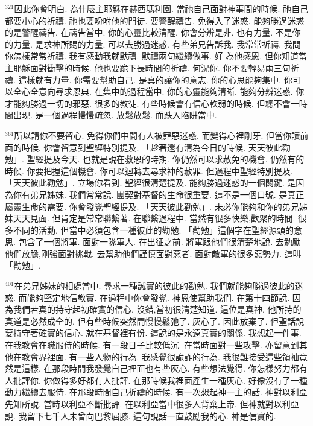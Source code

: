 \documentclass{book}
\begin{document}
$^{321}$因此你會明白.
為什麼主耶穌在赫西瑪利園.
當祂自己面對神事間的時候.
祂自己都要小心的祈禱.
祂也要吩咐他的門徒.
要警醒禱告.
免得入了迷惑.
能夠勝過迷惑的是警醒禱告.
在禱告當中.
你的心靈比較清醒.
你會分辨是非.
也有力量.
不是你的力量.
是求神所賜的力量.
可以去勝過迷惑.
有些弟兄告訴我.
我常常祈禱.
我問你怎樣常常祈禱.
我有感動我就默禱.
默禱兩句繼續做事.
好 為他感恩.
但你知道當主耶穌面對衝擊的時候.
他也要跪下長時間的祈禱.
何況你.
你不要輕易兩三句祈禱.
這樣就有力量.
你需要幫助自己.
是真的讓你的意志.
你的心思能夠集中.
你可以全心全意向尋求恩典.
在集中的過程當中.
你的心靈能夠清晰.
能夠分辨迷惑.
你才能夠勝過一切的邪惡.
很多的教徒.
有些時候會有信心軟弱的時候.
但總不會一時間出現.
是一個過程慢慢疏忽.
放鬆放鬆.
而跌入陷阱當中.

$^{361}$所以請你不要留心.
免得你們中間有人被罪惡迷惑.
而變得心裡剛牙.
但當你讀前面的時候.
你會留意到聖經特別提及.
「趁著還有清為今日的時候.
天天彼此勸勉」.
聖經提及今天.
也就是說在救恩的時期.
你仍然可以求赦免的機會.
仍然有的時候.
你要把握這個機會.
你可以迴轉去尋求神的赦罪.
但過程中聖經特別提及.
「天天彼此勸勉」.
立場你看到.
聖經很清楚提及.
能夠勝過迷惑的一個關鍵.
是因為你有弟兄姊妹.
我們常常說.
團契對基督的生命很重要.
這不是一個口號.
是真正屬靈生命的需要.
你會發覺聖經提及.
「天天彼此勸勉」.
未必你能夠和你的弟兄姊妹天天見面.
但肯定是常常聯繫著.
在聯繫過程中.
當然有很多快樂,歡聚的時間.
很多不同的活動.
但當中必須包含一種彼此的勸勉.
「勸勉」這個字在聖經源頭的意思.
包含了一個將軍.
面對一隊軍人.
在出征之前.
將軍跟他們很清楚地說.
去勉勵他們放膽,剛強面對挑戰.
去幫助他們謹慎面對惡者.
面對敵軍的很多惡勢力.
這叫「勸勉」.

$^{401}$在弟兄姊妹的相處當中.
尋求一種誠實的彼此的勸勉.
我們就能夠勝過彼此的迷惑.
而能夠堅定地信教實.
在過程中你會發覺.
神恩使幫助我們.
在第十四節說.
因為我們若真的持守起初確實的信心.
沒錯,當初很清楚知道.
這位是真神.
他所持的真道是必然成全的.
但有些時候突然間慢慢鬆弛了.
灰心了.
因此放棄了.
但聖話說要持守著確實的信心.
就在基督裡有份.
這說的是永遠真實的關係.
我想起一件事.
在我教會在職服侍的時候.
有一段日子比較低沉.
在當時面對一些攻擊.
亦留意到其他在教會界裡面.
有一些人物的行為.
我感覺很詭詐的行為.
我很難接受這些領袖竟然是這樣.
在那段時間我發覺自己裡面也有些灰心.
有些想法覺得.
你怎樣努力都有人批評你.
你做得多好都有人批評.
在那時候我裡面產生一種灰心.
好像沒有了一種動力繼續去服侍.
在那段時間自己祈禱的時候.
有一次想起神一主的話.
神對以利亞先知所說.
當時以利亞不斷批評.
在以利亞當中很多人背棄上帝.
但神就對以利亞說.
我留下七千人未曾向巴黎屈膝.
這句說話一直鼓勵我的心.
神是信實的.
\end{document}
